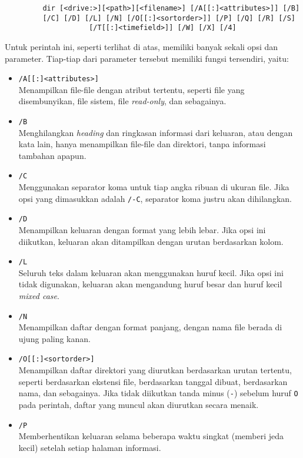 \begin{itemize}
	\begin{verbatim}
         dir [<drive:>][<path>][<filename>] [/A[[:]<attributes>]] [/B] 
         [/C] [/D] [/L] [/N] [/O[[:]<sortorder>]] [/P] [/Q] [/R] [/S] 
                    [/T[[:]<timefield>]] [/W] [/X] [/4]
	\end{verbatim}
	
	Untuk perintah ini, seperti terlihat di atas, memiliki banyak sekali opsi dan parameter. Tiap-tiap dari parameter tersebut memiliki fungsi tersendiri, yaitu:
	\begin{itemize}
		\item \verb|/A[[:]<attributes>]|\\
		Menampilkan file-file dengan atribut tertentu, seperti file yang disembunyikan, file sistem, file \textit{read-only}, dan sebagainya.
		\item \verb|/B|\\
		Menghilangkan \textit{heading} dan ringkasan informasi dari keluaran, atau dengan kata lain, hanya menampilkan file-file dan direktori, tanpa informasi tambahan apapun.
		\item \verb|/C|\\
		Menggunakan separator koma untuk tiap angka ribuan di ukuran file. Jika opsi yang dimasukkan adalah \verb|/-C|, separator koma justru akan dihilangkan.
		\item \verb|/D|\\
		Menampilkan keluaran dengan format yang lebih lebar. Jika opsi ini diikutkan, keluaran akan ditampilkan dengan urutan berdasarkan kolom.
		\item \verb|/L|\\
		Seluruh teks dalam keluaran akan menggunakan huruf kecil. Jika opsi ini tidak digunakan, keluaran akan mengandung huruf besar dan huruf kecil \textit{mixed case}.
		\item \verb|/N|\\
		Menampilkan daftar dengan format panjang, dengan nama file berada di ujung paling kanan.
		\item \verb|/O[[:]<sortorder>]|\\
		Menampilkan daftar direktori yang diurutkan berdasarkan urutan tertentu, seperti berdasarkan ekstensi file, berdasarkan tanggal dibuat, berdasarkan nama, dan sebagainya. Jika tidak diikutkan tanda minus (\verb|-|) sebelum huruf \verb|O| pada perintah, daftar yang muncul akan diurutkan secara menaik.
		\item \verb|/P|\\
		Memberhentikan keluaran selama beberapa waktu singkat (memberi jeda kecil) setelah setiap halaman informasi.

\end{itemize}
\end{itemize}
